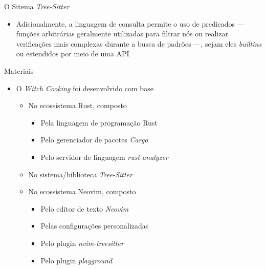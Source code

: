 \documentclass
  [ aspectratio=169,
    english,
    hyperref={citecolor=blue,colorlinks=true,linkcolor=blue,urlcolor=blue},
    brazil]
  {beamer}
\newcommand{\treesitter}{\textit{Tree-Sitter}\xspace}
\newcommand{\witchcooking}{\textit{Witch Cooking}\xspace}
\begin{document}
  \begin{frame}{O Sitema \treesitter}
    \begin{itemize}
      \item Adicionalmente, a linguagem de consulta permite o uso de predicados
            --- funções arbitrárias geralmente utilizadas para filtrar nós ou
            realizar verificações mais complexas durante a busca de padrões
            ---, sejam eles \textit{builtins} ou estendidos por meio de uma API
    \end{itemize}
  \end{frame}


  \begin{frame}{Materiais}
    \begin{itemize}
      \item O \witchcooking foi desenvolvido com base
            \begin{itemize}
              \item No ecossistema Rust, composto
                    \begin{itemize}
                      \item Pela linguagem de programação Rust
                            \cite{rust-2023-rust}
                      \item Pelo gerenciador de pacotes \textit{Cargo}
                            \cite{rust-2023-cargo}
                      \item Pelo servidor de linguagem \textit{rust-analyzer}
                            \cite{rust-analyzer-2023-rust}
                    \end{itemize}
              \item No sistema/biblioteca \treesitter
                    \cite{tree-sitter-2023-tree}
              \item No ecossistema Neovim, composto
                    \begin{itemize}
                      \item Pelo editor de texto \textit{Neovim}
                            \cite{neovim-2023-hyperextensible}
                      \item Pelas configurações personalizadas
                            \cite{silva-2023-uma}
                      \item Pelo plugin \textit{nvim-treesitter}
                            \cite{nvim-treesitter-2023-nvim}
                      \item Pelo plugin \textit{playground}
                            \cite{nvim-treesitter-2023-playground}
                    \end{itemize}
            \end{itemize}
    \end{itemize}
  \end{frame}
\end{document}

